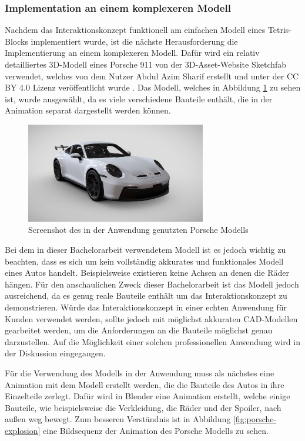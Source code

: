 \subsubsection{Implementation an einem komplexeren Modell}

Nachdem das Interaktionskonzept funktionell am einfachen Modell eines Tetris-Blocks implementiert wurde, ist die nächste Herausforderung die Implementierung an einem komplexeren Modell.
Dafür wird ein relativ detailliertes 3D-Modell eines Porsche 911 von der 3D-Asset-Website Sketchfab verwendet, welches von dem Nutzer Abdul Azim Sharif erstellt und unter der CC BY 4.0 Lizenz veröffentlicht wurde \autocite[][]{SketchfabPorsche}.
Das Modell, welches in Abbildung \ref{fig:porsche} zu sehen ist, wurde ausgewählt, da es viele verschiedene Bauteile enthält, die in der Animation separat dargestellt werden können.

\begin{figure}[H]
    \centering
    \includegraphics[width=0.7\textwidth]{images/PorscheModell.png}
    \caption{Screenshot des in der Anwendung genutzten Porsche Modells}
    \label{fig:porsche}
\end{figure}

Bei dem in dieser Bachelorarbeit verwendetem Modell ist es jedoch wichtig zu beachten, dass es sich um kein vollständig akkurates und funktionales Modell eines Autos handelt.
Beispielsweise existieren keine Achsen an denen die Räder hängen.
Für den anschaulichen Zweck dieser Bachelorarbeit ist das Modell jedoch ausreichend, da es genug \glqq{}reale\grqq{}  Bauteile enthält um das Interaktionskonzept zu demonstrieren.
Würde das Interaktionskonzept in einer echten Anwendung für Kunden verwendet werden, sollte jedoch mit möglichst akkuraten CAD-Modellen gearbeitet werden, um die Anforderungen an die Bauteile möglichst genau darzustellen.
Auf die Möglichkeit einer solchen professionellen Anwendung wird in der Diskussion eingegangen.

Für die Verwendung des Modells in der Anwendung muss als nächstes eine Animation mit dem Modell erstellt werden, die die Bauteile des Autos in ihre Einzelteile zerlegt.
Dafür wird in Blender eine Animation erstellt, welche einige Bauteile, wie beispielsweise die Verkleidung, die Räder und der Spoiler, nach außen weg bewegt.
Zum besseren Verständnis ist in Abbildung \ref{fig:porsche-explosion} eine Bildsequenz der Animation des Porsche Modells zu sehen.

